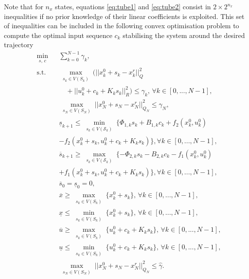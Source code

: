 \documentclass[letterpaper, 10 pt, conference]{ieeeconf}
\begin{document}
Note that for $n_x$ states, equations \eqref{eq:tube1} and  \eqref{eq:tube2} consist in $2 \times 2^{n_x}$ inequalities if no prior knowledge of their linear coefficients is exploited. This set of inequalities can be included in the following convex optimisation problem to compute the optimal input sequence $c_k$ stabilising the system around the desired trajectory
%
\begin{align}
\label{eq:cvx}
& \min_{\substack{s, \, c}} & &   \sum_{k = 0}^{N-1} \gamma_k, 
\\
& \text{s.t.} &&  \max_{\substack{s_k \in V(S_k)}} ( || x_k^0 + s_k - x_k^r ||_Q^2 \nonumber\\ & & &  \quad + ||  u_k^0 + c_k + K_k s_k ||_R^2) \leq \gamma_k, \, \forall k \in [0,... , N-1],
\nonumber\\
& & & \max_{\substack{s_N \in V(S_N)}} || x_N^0 + s_N - x_N^r ||_{Q_N}^2  \leq \gamma_N, 
\nonumber\\
& & & \underline{s}_{k+1} \leq \min_{\substack{s_{k} \in V(\mathcal{S}_k)}} \{ \Phi_{1, k} s_{k} + B_{1, k} c_k + f_2(x^0_k, u^0_k) \nonumber\\ & & &  - f_2(x^0_k + s_{k}, u^0_k + c_k + K_k s_{k})  \}, \forall k \in [0,... , N-1],
\nonumber\\
& & & \overline{s}_{k+1} \geq \max_{\substack{s_{k} \in V(\mathcal{S}_k)}} \{- \Phi_{2, k} s_{k} - B_{2, k} c_k -f_1(x^0_k, u^0_k) \nonumber\\ & & &+ f_1(x^0_k + s_{k}, u^0_k + c_k + K_k s_{k}) \}, \forall k \in [0,... , N-1],
\nonumber\\
& & &    \overline{s}_{0} = \underline{s}_{0} = 0, 
\nonumber\\
& & &    \overline{x} \geq \max_{\substack{s_k \in V(S_k)}} \{x_k^0 + s_k \}, \, \forall k \in [0, ... , N-1], 
\nonumber\\
& & & \underline{x} \leq \min_{\substack{s_k \in V(S_k)}} \{x_k^0 + s_k \}, \, \forall k \in [0, ... , N-1], \nonumber\\
& & &   \overline{u} \geq \max_{\substack{s_k \in V(S_k)}} \{u_k^0 + c_k + K_k s_k \}, \, \forall k \in [0, ... , N-1], 
\nonumber\\
& & &   \underline{u} \leq \min_{\substack{s_k \in V(S_k)}} \{u_k^0 + c_k + K_k s_k \}, \, \forall k \in [0, ... , N-1], 
\nonumber\\
& & &  \max_{\substack{s_N \in V(S_N)}} || x_N^0 + s_N - x_N^r ||_{Q_N}^2 \leq \hat{\gamma}. 
\nonumber
\end{align}
\end{document}

